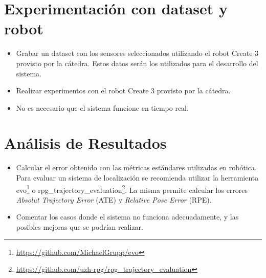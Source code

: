 \documentclass[tp]{lcc}
\begin{document}
	
	\section{Experimentación con dataset y robot}
	\begin{itemize}
		\item Grabar un dataset con los sensores seleccionados utilizando el robot Create 3 provisto por la cátedra. Estos datos serán los utilizados para el desarrollo del sistema.
		
		\item Realizar experimentos con el robot Create 3 provisto por la cátedra.
		
		\item No es necesario que el sistema funcione en tiempo real.
	\end{itemize}
	
	
	\section{Análisis de Resultados}
		\begin{itemize}
			\item Calcular el error obtenido con las métricas estándares utilizadas en robótica. Para evaluar un sistema de localización se recomienda utilizar la herramienta evo\footnote{\url{https://github.com/MichaelGrupp/evo}} o rpg\_trajectory\_evaluation\footnote{\url{https://github.com/uzh-rpg/rpg_trajectory_evaluation}}. La misma permite calcular los errores \emph{Absolut Trajectory Error} (ATE) y \emph{Relative Pose Error} (RPE).
		
			\item Comentar los casos donde el sistema no funciona adecuadamente, y las posibles mejoras que se podrían realizar.
		\end{itemize}

	\printbibliography
	
\end{document}
